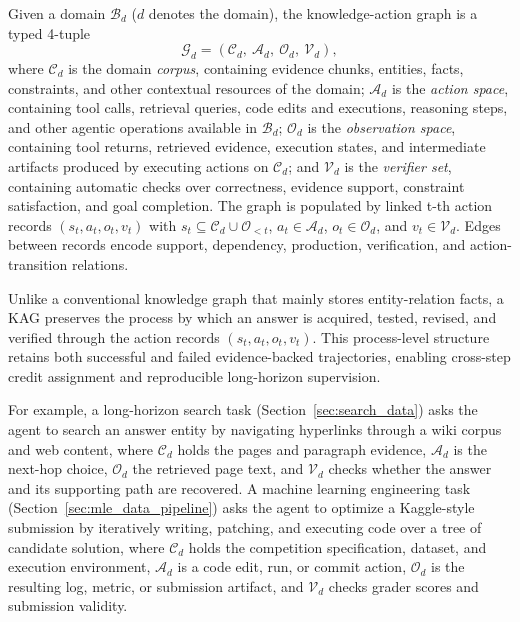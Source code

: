 \begin{definition}
Given a domain $\mathcal{B}_d$ ($d$ denotes the domain), the knowledge-action graph is a typed 4-tuple
\begin{equation}
\mathcal{G}_d = (\mathcal{C}_d,\ \mathcal{A}_d,\ \mathcal{O}_d,\ \mathcal{V}_d),
\label{eq:kag}
\end{equation}
where $\mathcal{C}_d$ is the domain \emph{corpus}, containing evidence chunks, entities, facts, constraints, and other contextual resources of the domain; $\mathcal{A}_d$ is the \emph{action space}, containing tool calls, retrieval queries, code edits and executions, reasoning steps, and other agentic operations available in $\mathcal{B}_d$; $\mathcal{O}_d$ is the \emph{observation space}, containing tool returns, retrieved evidence, execution states, and intermediate artifacts produced by executing actions on $\mathcal{C}_d$; and $\mathcal{V}_d$ is the \emph{verifier set}, containing automatic checks over correctness, evidence support, constraint satisfaction, and goal completion. The graph is populated by linked t-th action records $(s_t, a_t, o_t, v_t)$ with $s_t \subseteq \mathcal{C}_d \cup \mathcal{O}_{<t}$, $a_t \in \mathcal{A}_d$, $o_t \in \mathcal{O}_d$, and $v_t \in \mathcal{V}_d$. Edges between records encode support, dependency, production, verification, and action-transition relations.
\end{definition}

Unlike a conventional knowledge graph that mainly stores entity-relation facts, a KAG preserves the process by which an answer is acquired, tested, revised, and verified through the action records $(s_t, a_t, o_t, v_t)$. This process-level structure retains both successful and failed evidence-backed trajectories, enabling cross-step credit assignment and reproducible long-horizon supervision. 

For example, a long-horizon search task (Section~\ref{sec:search_data}) asks the agent to search an answer entity by navigating hyperlinks through a wiki corpus and web content, where $\mathcal{C}_d$ holds the pages and paragraph evidence, $\mathcal{A}_d$ is the next-hop choice, $\mathcal{O}_d$ the retrieved page text, and $\mathcal{V}_d$ checks whether the answer and its supporting path are recovered. A machine learning engineering task (Section~\ref{sec:mle_data_pipeline}) asks the agent to optimize a Kaggle-style submission by iteratively writing, patching, and executing code over a tree of candidate solution, where $\mathcal{C}_d$ holds the competition specification, dataset, and execution environment, $\mathcal{A}_d$ is a code edit, run, or commit action, $\mathcal{O}_d$ is the resulting log, metric, or submission artifact, and $\mathcal{V}_d$ checks grader scores and submission validity.

